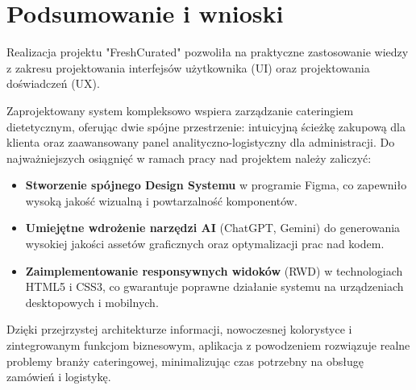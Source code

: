 \chapter{Podsumowanie i wnioski}

Realizacja projektu "FreshCurated" pozwoliła na praktyczne zastosowanie wiedzy z zakresu projektowania interfejsów użytkownika (UI) oraz projektowania doświadczeń (UX). 

Zaprojektowany system kompleksowo wspiera zarządzanie cateringiem dietetycznym, oferując dwie spójne przestrzenie: intuicyjną ścieżkę zakupową dla klienta oraz zaawansowany panel analityczno-logistyczny dla administracji. Do najważniejszych osiągnięć w ramach pracy nad projektem należy zaliczyć:
\begin{itemize}
    \item \textbf{Stworzenie spójnego Design Systemu} w programie Figma, co zapewniło wysoką jakość wizualną i powtarzalność komponentów.
    \item \textbf{Umiejętne wdrożenie narzędzi AI} (ChatGPT, Gemini) do generowania wysokiej jakości assetów graficznych oraz optymalizacji prac nad kodem.
    \item \textbf{Zaimplementowanie responsywnych widoków} (RWD) w technologiach HTML5 i CSS3, co gwarantuje poprawne działanie systemu na urządzeniach desktopowych i mobilnych.
\end{itemize}

Dzięki przejrzystej architekturze informacji, nowoczesnej kolorystyce i zintegrowanym funkcjom biznesowym, aplikacja z powodzeniem rozwiązuje realne problemy branży cateringowej, minimalizując czas potrzebny na obsługę zamówień i logistykę.